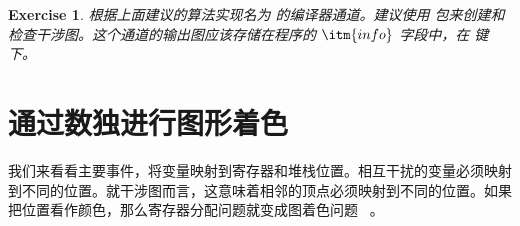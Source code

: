 \documentclass[11pt]{book}
\newcommand{\margincomment}[1]{\marginpar{\color{comment-red}\tiny #1}}
\newcommand{\margincomment}[1]{}
\newtheorem{exercise}[theorem]{Exercise}
\begin{document}

\begin{exercise}\normalfont
根据上面建议的算法实现名为  的编译器通道。建议使用 
包来创建和检查干涉图。这个通道的输出图应该存储在程序的 $\itm{info}$ 字段中，在  键下。
\end{exercise}

  
\section{通过数独进行图形着色}
\label{sec:graph-coloring}

我们来看看主要事件，将变量映射到寄存器和堆栈位置。相互干扰的变量必须映射到不同的位置。就干涉图而言，这意味着相邻的顶点必须映射到不同的位置。如果把位置看作颜色，那么寄存器分配问题就变成图着色问题~\citep{Balakrishnan:1996ve,Rosen:2002bh} 。
\end{document}
